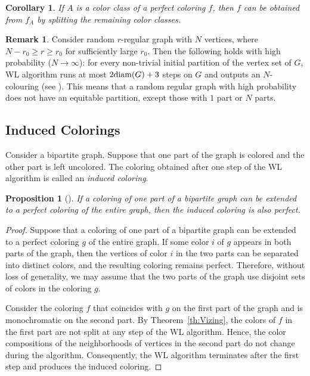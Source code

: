 \documentclass[11pt]{article}
\newtheorem{claim}{Proposition}[section]
\newtheorem{corollary}{Corollary}[section]
\theoremstyle{definition}
\newtheorem{remark}{Remark}[section]
\begin{document}
\begin{corollary}
If $A$ is a color class of a perfect coloring $f$, then $f$ can be obtained from $f_A$ by splitting the remaining color classes.
\end{corollary}

\begin{remark}
Consider random $r$-regular graph with $N$ vertices, where $N-r_0\geq r\geq r_0$ for sufficiently large   $r_0$.
Then the following holds with high probability ($N\rightarrow \infty$): for every non-trivial initial partition  of the vertex set of $G$,
 WL algorithm runs at most $2{\rm diam}(G)+3$ steps on $G$ and outputs an $N$-colouring (see \cite{Isaev}).
 This means that a random regular graph with high probability does not
have an equitable partition, except those with $1$ part or $N$ parts.
\end{remark}









\subsection{Induced Colorings}\label{Vizing2}

Consider a bipartite graph. Suppose that one part of the graph is colored and the other part is left uncolored. The coloring obtained after one step of the WL algorithm is called an {\sl induced coloring}.

\begin{claim}[\cite{Lis}]
If a coloring of one part of a bipartite graph can be extended to a perfect coloring of the entire graph, then the induced coloring is also perfect.
\end{claim}









\begin{proof}
Suppose that a coloring of one part of a bipartite graph can be extended to a perfect coloring $g$ of the entire graph. If some color $i$ of $g$ appears in both parts of the graph, then the vertices of color $i$ in the two parts can be separated into distinct colors, and the resulting coloring remains perfect. Therefore, without loss of generality, we may assume that the two parts of the graph use disjoint sets of colors in the coloring $g$.

Consider the coloring $f$ that coincides with $g$ on the first part of the graph and is monochromatic on the second part. By Theorem~\ref{th:Vizing}, the colors of $f$ in the first part are not split at any step of the WL algorithm. Hence, the color compositions of the neighborhoods of vertices in the second part do not change during the algorithm. Consequently, the WL algorithm terminates after the first step and produces the induced coloring.
\end{proof}
\end{document}
